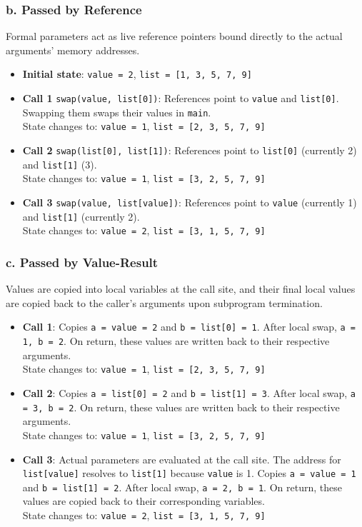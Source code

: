 \documentclass[11pt]{article}
\begin{document}
\subsubsection*{b. Passed by Reference}
Formal parameters act as live reference pointers bound directly to the actual arguments' memory addresses.
\begin{itemize}
    \item \textbf{Initial state}: \texttt{value = 2}, \texttt{list = [1, 3, 5, 7, 9]}
    \item \textbf{Call 1} \texttt{swap(value, list[0])}: References point to \texttt{value} and \texttt{list[0]}. Swapping them swaps their values in \texttt{main}.
          \\ State changes to: \texttt{value = 1}, \texttt{list = [2, 3, 5, 7, 9]}
    \item \textbf{Call 2} \texttt{swap(list[0], list[1])}: References point to \texttt{list[0]} (currently 2) and \texttt{list[1]} (3).
          \\ State changes to: \texttt{value = 1}, \texttt{list = [3, 2, 5, 7, 9]}
    \item \textbf{Call 3} \texttt{swap(value, list[value])}: References point to \texttt{value} (currently 1) and \texttt{list[1]} (currently 2).
          \\ State changes to: \texttt{value = 2}, \texttt{list = [3, 1, 5, 7, 9]}
\end{itemize}

\subsubsection*{c. Passed by Value-Result}
Values are copied into local variables at the call site, and their final local values are copied back to the caller's arguments upon subprogram termination.
\begin{itemize}
    \item \textbf{Call 1}: Copies \texttt{a = value = 2} and \texttt{b = list[0] = 1}. After local swap, \texttt{a = 1, b = 2}. On return, these values are written back to their respective arguments.
          \\ State changes to: \texttt{value = 1}, \texttt{list = [2, 3, 5, 7, 9]}
    \item \textbf{Call 2}: Copies \texttt{a = list[0] = 2} and \texttt{b = list[1] = 3}. After local swap, \texttt{a = 3, b = 2}. On return, these values are written back to their respective arguments.
          \\ State changes to: \texttt{value = 1}, \texttt{list = [3, 2, 5, 7, 9]}
    \item \textbf{Call 3}: Actual parameters are evaluated at the call site. The address for \texttt{list[value]} resolves to \texttt{list[1]} because \texttt{value} is 1. Copies \texttt{a = value = 1} and \texttt{b = list[1] = 2}. After local swap, \texttt{a = 2, b = 1}. On return, these values are copied back to their corresponding variables.
          \\ State changes to: \texttt{value = 2}, \texttt{list = [3, 1, 5, 7, 9]}
\end{itemize}
\end{document}

